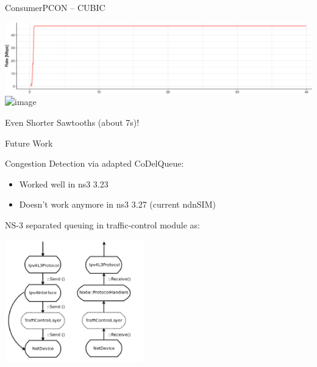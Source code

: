 \begin{frame}{ConsumerPCON -- CUBIC}

\includegraphics[width=\linewidth]{figs/cons_cubic_rate.png}\\
\pause
\includegraphics<1-2>[width=\linewidth]{figs/cons_cubic_queue.png}

Even Shorter Sawtooths (about 7s)!

\end{frame}


\begin{frame}{Future Work}

Congestion Detection via adapted CoDelQueue:
\begin{itemize}
\item Worked well in ns3 3.23
\pause
\item Doesn't work anymore in ns3 3.27 (current ndnSIM)
\end{itemize}

\pause
NS-3 separated queuing in traffic-control module as:

\centering
\includegraphics[height=150pt]{figs/ns3-queue.png}
\end{frame}


